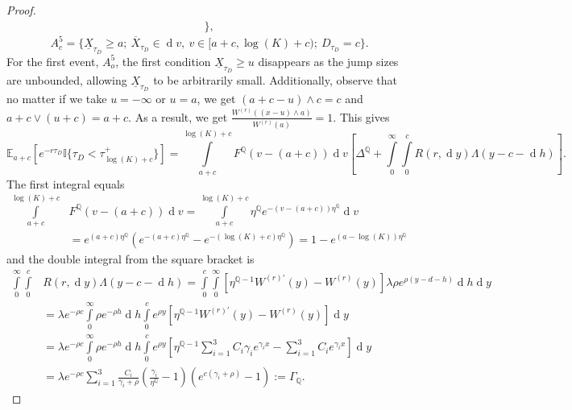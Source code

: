 \documentclass[10pt,a4paper]{amsart}
\def\E{{\mathbb{E}}}
\def\Q{{\mathbb{Q}}}
\def \R{{{\rm I{\!}\rm R}}}
\def \I{{\mathbb{I}}}
\newcommand{\dx}{\operatorname{d}\!}
\def\E{{\mathbb E}} \def\PP{\mc P} \def\Z{{\mathbb Z}} \def\R{{\mathbb R}}
\begin{document}
\begin{proof}
\begin{align*}
				\},
			\end{align*}
			\begin{equation*}
				A_c^5 = \{ \underline{X}_{\tau_D} \geq a;\ \overline{X}_{\tau_D} \in \dx v,\ v \in [a+c, \log(K) +c);\  D_{\tau_D} =c \}.
			\end{equation*}
			For the first event, $A_o^5$, the first condition $\underline{X}_{\tau_D} \geq u$ disappears as the jump sizes are unbounded, allowing $\underline{X}_{\tau_D}$ to be arbitrarily small. Additionally, observe that no matter if we take $u=-\infty$ or $u=a$, we get $(a+c-u)\wedge c = c$ and $a+c \vee (u+c) = a+c$. As a result, we get $\frac{W^{(r)} ((x-u)\wedge a)}{W^{(r)}(a)} = 1$.
			This gives
			\begin{equation*}
				\E_{a+c} \left[ e^{-r\tau_D} \I \{ \tau_D < \tau_{\log(K)+c}^+ \} \right] = \int\limits_{a+c}^{\log(K)+c}F^\Q(v-(a+c))\dx v \left[ \Delta^\Q + \int\limits_{0}^{\infty}\int\limits_{0}^{c} R(r,\dx y) 	\Lambda(y-c-\dx h)  \right].
			\end{equation*}
			The first integral equals
			\begin{align*}
				\int\limits_{a+c}^{\log(K)+c}&F^\Q(v-(a+c))\dx v = \int\limits_{a+c}^{\log(K)+c} \eta^\Q e^{-(v-(a+c))\eta^\Q} \dx v \\
				\nonumber &= e^{(a+c)\eta^\Q}\left(  e^{-(a+c)\eta^\Q} - e^{-(\log(K)+c)\eta^\Q}\right) = 1 - e^{(a-\log(K))\eta^\Q}
			\end{align*}
			and the double integral from the square bracket is
			\begin{align}
				\nonumber \int\limits_{0}^{\infty}\int\limits_{0}^{c} &R(r,\dx y) 	\Lambda(y-c-\dx h) = \int\limits_{0}^{c}\int\limits_{0}^{\infty} \left[\eta^{\Q-1} W^{(r)'}(y) - W^{(r)}(y) \right] \lambda\rho e^{\rho(y-d-h)} \dx h \dx y \\
				\nonumber &= \lambda e^{-\rho c} \int\limits_{0}^{\infty} \rho e^{-\rho h} \dx h \int\limits_{0}^{c} e^{\rho y} \left[\eta^{\Q-1} W^{(r)'}(y) - W^{(r)}(y) \right] \dx y \\
				\nonumber &= \lambda e^{-\rho c} \int\limits_{0}^{\infty} \rho e^{-\rho h} \dx h \int\limits_{0}^{c} e^{\rho y} \left[\eta^{\Q-1} \sum_{i=1}^3 C_i \gamma_i e^{\gamma_i x} -\sum_{i=1}^3 C_i e^{\gamma_i x} \right] \dx y \\
				&= \lambda e^{-\rho c} \sum_{i=1}^3 \frac{C_i}{\gamma_i + \rho} \left( \frac{\gamma_i}{\eta^\Q}-1\right)\left(e^{c(\gamma_i+\rho)}-1\right) := \Gamma_\Q. \label{deriveGamma}
			\end{align}

\end{proof}
\end{document}
